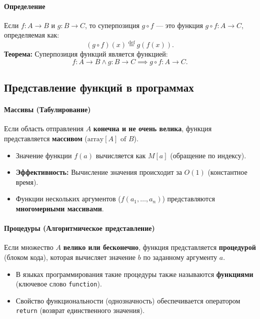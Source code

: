 \paragraph{Определение}
Если $f: A \to B$ и $g: B \to C$, то суперпозиция $g \circ f$ --- это функция $g \circ f: A \to C$, определяемая как:
$$(g \circ f)(x) \stackrel{\text{def}}{=} g(f(x)).$$
\textbf{Теорема:} Суперпозиция функций является функцией:
$$f: A \to B \land g: B \to C \implies g \circ f: A \to C.$$

\subsection*{Представление функций в программах}

\paragraph{Массивы (Табулирование)}
Если область отправления $A$ \textbf{конечна и не очень велика}, функция представляется \textbf{массивом} ($\text{array} [A] \text{ of } B$).
\begin{itemize}
    \item Значение функции $f(a)$ вычисляется как $M[a]$ (обращение по индексу).
    \item \textbf{Эффективность:} Вычисление значения происходит за $O(1)$ (константное время).
    \item Функции нескольких аргументов ($f(a_1, \ldots, a_n)$) представляются \textbf{многомерными массивами}.
\end{itemize}

\paragraph{Процедуры (Алгоритмическое представление)}
Если множество $A$ \textbf{велико или бесконечно}, функция представляется \textbf{процедурой} (блоком кода), которая вычисляет значение $b$ по заданному аргументу $a$.
\begin{itemize}
    \item В языках программирования такие процедуры также называются \textbf{функциями} (ключевое слово \texttt{function}).
    \item Свойство функциональности (однозначность) обеспечивается оператором \texttt{return} (возврат единственного значения).
\end{itemize}